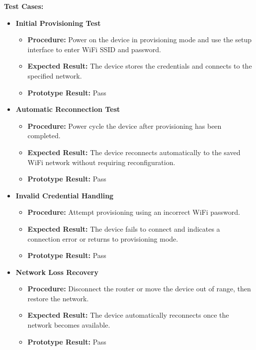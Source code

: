 \noindent{}\textbf{Test Cases:}
\begin{itemize}
\setlength{\itemsep}{0pt}
\setlength{\parskip}{0pt}
\setlength{\parsep}{0pt}
\setlength{\topsep}{0pt}

    \item \textbf{Initial Provisioning Test}
    \begin{itemize}
        \item \textbf{Procedure:} Power on the device in provisioning mode and use the setup interface to enter WiFi SSID and password.
        \item \textbf{Expected Result:} The device stores the credentials and connects to the specified network.
        \item \textbf{Prototype Result:} Pass
    \end{itemize}

    \item \textbf{Automatic Reconnection Test}
    \begin{itemize}
        \item \textbf{Procedure:} Power cycle the device after provisioning has been completed.
        \item \textbf{Expected Result:} The device reconnects automatically to the saved WiFi network without requiring reconfiguration.
        \item \textbf{Prototype Result:} Pass
    \end{itemize}

    \item \textbf{Invalid Credential Handling}
    \begin{itemize}
        \item \textbf{Procedure:} Attempt provisioning using an incorrect WiFi password.
        \item \textbf{Expected Result:} The device fails to connect and indicates a connection error or returns to provisioning mode.
        \item \textbf{Prototype Result:} Pass
    \end{itemize}

    \item \textbf{Network Loss Recovery}
    \begin{itemize}
        \item \textbf{Procedure:} Disconnect the router or move the device out of range, then restore the network.
        \item \textbf{Expected Result:} The device automatically reconnects once the network becomes available.
        \item \textbf{Prototype Result:} Pass
    \end{itemize}


\end{itemize}

